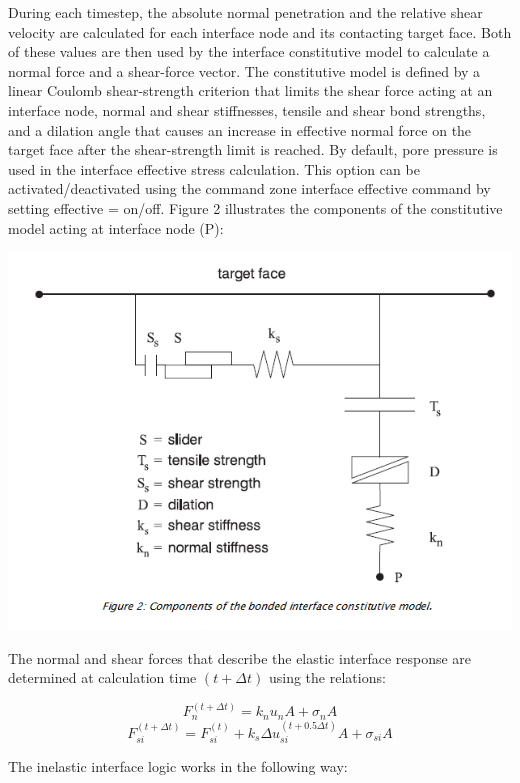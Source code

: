 \documentclass[a4paper, nobind]{templates/ociamthesis}
\begin{document}
During each timestep, the absolute normal penetration and the relative
shear velocity are calculated for each interface node and its contacting
target face. Both of these values are then used by the interface
constitutive model to calculate a normal force and a shear-force vector.
The constitutive model is defined by a linear Coulomb shear-strength
criterion that limits the shear force acting at an interface node,
normal and shear stiffnesses, tensile and shear bond strengths, and a
dilation angle that causes an increase in effective normal force on the
target face after the shear-strength limit is reached. By default, pore
pressure is used in the interface effective stress calculation. This
option can be activated/deactivated using the command zone interface
effective command by setting effective = on/off. Figure 2 illustrates
the components of the constitutive model acting at interface node (P):

\includegraphics[width=1\linewidth]{myfigureeeeee/interface-constitutive}

The normal and shear forces that describe the elastic interface response
are determined at calculation time \((t + \Delta t)\) using the relations:

\[ F_n^{(t + \Delta t)} = k_n u_n A + \sigma_n A  \]
\[ F_{si}^{(t + \Delta t)} = F_{si}^{(t)} + k_s \Delta u_{si}^{(t + 0.5 \Delta t)} A + \sigma_{si} A\]

The inelastic interface logic works in the following way:
\end{document}
